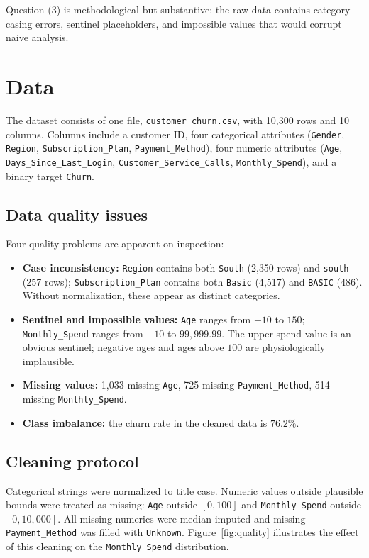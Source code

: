 \documentclass[11pt]{article}
\begin{document}
Question (3) is methodological but substantive: the raw data contains category-casing errors, sentinel placeholders, and impossible values that would corrupt naive analysis.

\section{Data}
The dataset consists of one file, \texttt{customer churn.csv}, with 10{,}300 rows and 10 columns. Columns include a customer ID, four categorical attributes (\texttt{Gender}, \texttt{Region}, \texttt{Subscription\_Plan}, \texttt{Payment\_Method}), four numeric attributes (\texttt{Age}, \texttt{Days\_Since\_Last\_Login}, \texttt{Customer\_Service\_Calls}, \texttt{Monthly\_Spend}), and a binary target \texttt{Churn}.

\subsection{Data quality issues}
Four quality problems are apparent on inspection:
\begin{itemize}
    \item \textbf{Case inconsistency:} \texttt{Region} contains both \texttt{South} (2{,}350 rows) and \texttt{south} (257 rows); \texttt{Subscription\_Plan} contains both \texttt{Basic} (4{,}517) and \texttt{BASIC} (486). Without normalization, these appear as distinct categories.
    \item \textbf{Sentinel and impossible values:} \texttt{Age} ranges from $-10$ to $150$; \texttt{Monthly\_Spend} ranges from $-10$ to $99{,}999.99$. The upper spend value is an obvious sentinel; negative ages and ages above $100$ are physiologically implausible.
    \item \textbf{Missing values:} 1{,}033 missing \texttt{Age}, 725 missing \texttt{Payment\_Method}, 514 missing \texttt{Monthly\_Spend}.
    \item \textbf{Class imbalance:} the churn rate in the cleaned data is $76.2\%$.
\end{itemize}

\subsection{Cleaning protocol}
Categorical strings were normalized to title case. Numeric values outside plausible bounds were treated as missing: \texttt{Age} outside $[0,100]$ and \texttt{Monthly\_Spend} outside $[0,10{,}000]$. All missing numerics were median-imputed and missing \texttt{Payment\_Method} was filled with \texttt{Unknown}. Figure~\ref{fig:quality} illustrates the effect of this cleaning on the \texttt{Monthly\_Spend} distribution.
\end{document}

